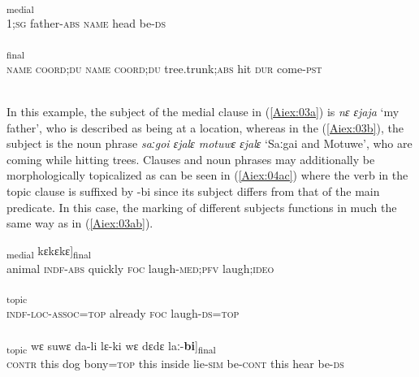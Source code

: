 \documentclass[output=paper]{LSP/langsci}
\begin{document}
\begin{exe}
\ex \label{Aiex:03ab}
\begin{xlist}
\ex \label{Aiex:03a}
\textsubscript{medial}\\
\textsc{1};\textsc{sg} father-\textsc{abs} \textsc{name} head be-\textsc{ds}\\
\glt {}\\
\ex \label{Aiex:03b}
\textsubscript{final}\\
‎\textsc{name} \textsc{coord};\textsc{du} \textsc{name} \textsc{coord};\textsc{du} tree.trunk;\textsc{abs} hit \textsc{dur} come-\textsc{pst}\\
\glt {}\\
\end{xlist}
\end{exe}

In this example, the subject of the medial clause in (\ref{Aiex:03a}) is \textit{nɛ ɛjaja} `my father', who is described as being at a location, whereas in the  (\ref{Aiex:03b}), the subject is the  noun phrase \textit{saːgoi ɛjalɛ motuwɛ ɛjalɛ} `Saːgai and Motuwe', who are coming while hitting trees. Clauses and noun phrases may additionally be morphologically topicalized as can be seen in  (\ref{Aiex:04ac}) where the verb in the topic clause is suffixed by -bi since its subject differs from that of the main predicate. In this case, the marking of different subjects functions in much the same way as in (\ref{Aiex:03ab}).

\begin{exe}
\ex \label{Aiex:04ac}
\begin{xlist}
\ex \label{Aiex:04a}
\gll [[na	no-wa ɛimɛ ka aɡlɛ-si]\textsubscript{medial} kɛkɛkɛ]\textsubscript{final}\\
animal	\textsc{indf}-\textsc{abs} quickly \textsc{foc} laugh-\textsc{med};\textsc{pfv} laugh;\textsc{ideo}\\
‎‎‎\glt {}\\
\ex \label{Aiex:04b}
\gll [no-wɛ-mi=jaː	ɛimɛ	ka	aɡlɛ-\textbf{bi}=jaː]\textsubscript{topic}\\
‎\textsc{indf}-‎\textsc{loc}-‎\textsc{assoc}=‎\textsc{top} already ‎\textsc{foc} laugh-‎\textsc{ds}=‎\textsc{top}\\
‎‎‎\glt {}\\
\ex \label{Aiex:04c}
\gll [[no	wɛ	aːɡɛ	kɛɡa=jaː]\textsubscript{topic}	wɛ	suwɛ	da-li	lɛ-ki	wɛ	dɛdɛ	laː-\textbf{bi}]\textsubscript{final}\\
\textsc{contr} this dog bony=‎\textsc{top} this inside lie-‎\textsc{sim} be-‎\textsc{cont} this hear be-‎\textsc{ds}\\
\glt {}\\
\end{xlist}
\end{exe}
\end{document}
